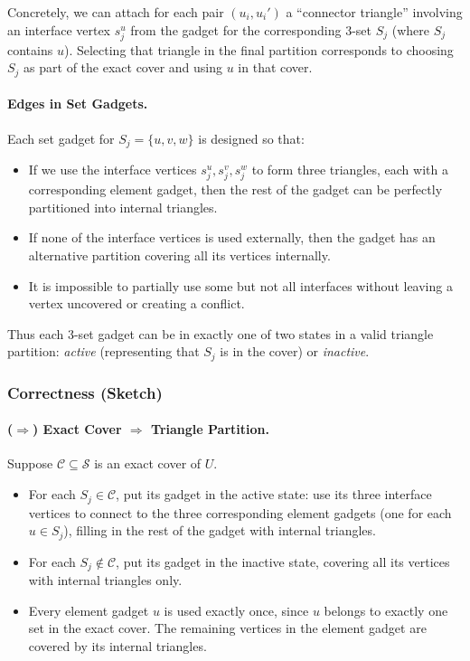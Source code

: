 \documentclass[9pt]{extarticle}
\begin{document}
Concretely, we can attach for each pair $(u_i,u_i')$ a “connector triangle”
involving an interface vertex $s_j^u$ from the gadget for the corresponding
3-set $S_j$ (where $S_j$ contains $u$).  Selecting that triangle in the final
partition corresponds to choosing $S_j$ as part of the exact cover and using
$u$ in that cover.

\paragraph{Edges in Set Gadgets.}
Each set gadget for $S_j = \{u,v,w\}$ is designed so that:
\begin{itemize}
    \item If we use the interface vertices $s_j^u, s_j^v, s_j^w$ to form three
          triangles, each with a corresponding element gadget, then the rest of
          the gadget can be perfectly partitioned into internal triangles.
    \item If none of the interface vertices is used externally, then the gadget
          has an alternative partition covering all its vertices internally.
    \item It is impossible to partially use some but not all interfaces without
          leaving a vertex uncovered or creating a conflict.
\end{itemize}
Thus each 3-set gadget can be in exactly one of two states in a valid triangle
partition: \emph{active} (representing that $S_j$ is in the cover) or
\emph{inactive}.

\subsubsection*{Correctness (Sketch)}

\paragraph{($\Rightarrow$) Exact Cover $\Rightarrow$ Triangle Partition.}
Suppose $\mathcal{C} \subseteq \mathcal{S}$ is an exact cover of $U$.

\begin{itemize}
    \item For each $S_j \in \mathcal{C}$, put its gadget in the active state:
          use its three interface vertices to connect to the three corresponding
          element gadgets (one for each $u \in S_j$), filling in the rest of the
          gadget with internal triangles.
    \item For each $S_j \notin \mathcal{C}$, put its gadget in the inactive
          state, covering all its vertices with internal triangles only.
    \item Every element gadget $u$ is used exactly once, since $u$ belongs to
          exactly one set in the exact cover.  The remaining vertices in the
          element gadget are covered by its internal triangles.
\end{itemize}
\end{document}
